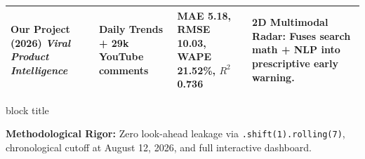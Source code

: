 \documentclass[aspectratio=169, 10pt]{beamer}
\newenvironment{highlightcard}[1][]{%
        \begin{beamercolorbox}[rounded=true,shadow=false,wd=\linewidth,sep=3.5pt,#1]{block title}%
        \fontsize{7.8pt}{9.8pt}\selectfont%
    }{%
        \end{beamercolorbox}%
    }
\begin{document}
\begin{frame}[t]
\begin{table}[h]
{\begin{tabular}{p{3.2cm}p{3.0cm}p{3.0cm}p{3.4cm}}
                \rowcolor{BlueAccent!10} \textbf{Our Project (2026)} \newline \textit{Viral Product Intelligence} & \textbf{Daily Trends + 29k YouTube comments} & \textbf{MAE 5.18, RMSE 10.03, WAPE 21.52\%, $R^2$ 0.736} & \textbf{2D Multimodal Radar:} Fuses search math + NLP into prescriptive early warning. \\
                \bottomrule
            \end{tabular}}
        \end{table}
        \vspace{-0.15cm}
        \begin{highlightcard}
            \centering\scriptsize
            \textbf{Methodological Rigor:} Zero look-ahead leakage via \texttt{.shift(1).rolling(7)}, chronological cutoff at August 12, 2026, and full interactive dashboard.
        \end{highlightcard}
    \end{frame}
\end{document}
